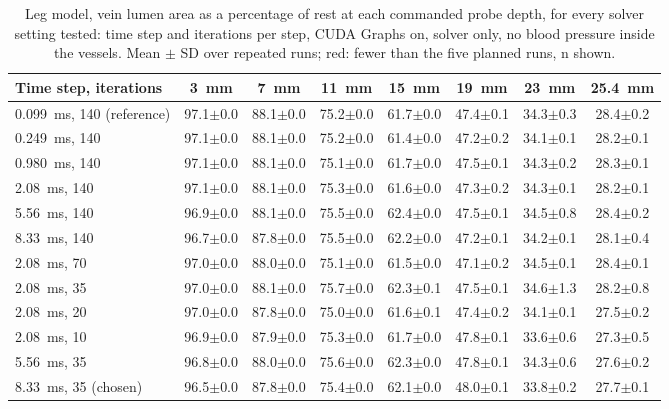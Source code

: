 \begin{table}[t]
\centering
\caption{Leg model, vein lumen area as a percentage of rest at each commanded probe depth, for every solver setting
tested: time step and iterations per step, CUDA Graphs on, solver only, no blood pressure inside the vessels. Mean
$\pm$ SD over repeated runs; red: fewer than the five planned runs, n shown.}
\label{tab:appendix_vein}
\footnotesize
\setlength{\tabcolsep}{3pt}
\begin{tabular}{lccccccc}
\hline
\textbf{Time step, iterations} & \textbf{3~mm} & \textbf{7~mm} & \textbf{11~mm} & \textbf{15~mm} & \textbf{19~mm} & \textbf{23~mm} & \textbf{25.4~mm} \\
\hline
0.099~ms, 140 (reference) & 97.1$\pm$0.0 & 88.1$\pm$0.0 & 75.2$\pm$0.0 & 61.7$\pm$0.0 & 47.4$\pm$0.1 & 34.3$\pm$0.3 & 28.4$\pm$0.2 \\
0.249~ms, 140 & 97.1$\pm$0.0 & 88.1$\pm$0.0 & 75.2$\pm$0.0 & 61.4$\pm$0.0 & 47.2$\pm$0.2 & 34.1$\pm$0.1 & 28.2$\pm$0.1 \\
0.980~ms, 140 & 97.1$\pm$0.0 & 88.1$\pm$0.0 & 75.1$\pm$0.0 & 61.7$\pm$0.0 & 47.5$\pm$0.1 & 34.3$\pm$0.2 & 28.3$\pm$0.1 \\
2.08~ms, 140 & 97.1$\pm$0.0 & 88.1$\pm$0.0 & 75.3$\pm$0.0 & 61.6$\pm$0.0 & 47.3$\pm$0.2 & 34.3$\pm$0.1 & 28.2$\pm$0.1 \\
5.56~ms, 140 & 96.9$\pm$0.0 & 88.1$\pm$0.0 & 75.5$\pm$0.0 & 62.4$\pm$0.0 & 47.5$\pm$0.1 & 34.5$\pm$0.8 & 28.4$\pm$0.2 \\
8.33~ms, 140 & 96.7$\pm$0.0 & 87.8$\pm$0.0 & 75.5$\pm$0.0 & 62.2$\pm$0.0 & 47.2$\pm$0.1 & 34.2$\pm$0.1 & 28.1$\pm$0.4 \\
2.08~ms, 70 & 97.0$\pm$0.0 & 88.0$\pm$0.0 & 75.1$\pm$0.0 & 61.5$\pm$0.0 & 47.1$\pm$0.2 & 34.5$\pm$0.1 & 28.4$\pm$0.1 \\
2.08~ms, 35 & 97.0$\pm$0.0 & 88.1$\pm$0.0 & 75.7$\pm$0.0 & 62.3$\pm$0.1 & 47.5$\pm$0.1 & 34.6$\pm$1.3 & 28.2$\pm$0.8 \\
2.08~ms, 20 & 97.0$\pm$0.0 & 87.8$\pm$0.0 & 75.0$\pm$0.0 & 61.6$\pm$0.1 & 47.4$\pm$0.2 & 34.1$\pm$0.1 & 27.5$\pm$0.2 \\
2.08~ms, 10 & 96.9$\pm$0.0 & 87.9$\pm$0.0 & 75.3$\pm$0.0 & 61.7$\pm$0.0 & 47.8$\pm$0.1 & 33.6$\pm$0.6 & 27.3$\pm$0.5 \\
5.56~ms, 35 & 96.8$\pm$0.0 & 88.0$\pm$0.0 & 75.6$\pm$0.0 & 62.3$\pm$0.0 & 47.8$\pm$0.1 & 34.3$\pm$0.6 & 27.6$\pm$0.2 \\
8.33~ms, 35 (chosen) & 96.5$\pm$0.0 & 87.8$\pm$0.0 & 75.4$\pm$0.0 & 62.1$\pm$0.0 & 48.0$\pm$0.1 & 33.8$\pm$0.2 & 27.7$\pm$0.1 \\
\hline
\end{tabular}
\end{table}
